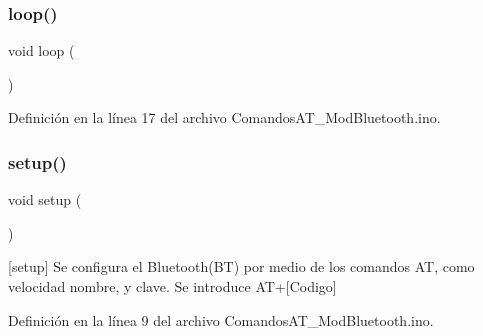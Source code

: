 \mbox{\label{_comandos_a_t___mod_bluetooth_8ino_afe461d27b9c48d5921c00d521181f12f}} 
\subsubsection{\texorpdfstring{loop()}{loop()}}
{\footnotesize\ttfamily void loop (\begin{DoxyParamCaption}{ }\end{DoxyParamCaption})}



Definición en la línea 17 del archivo Comandos\+A\+T\+\_\+\+Mod\+Bluetooth.\+ino.

\mbox{\label{_comandos_a_t___mod_bluetooth_8ino_a4fc01d736fe50cf5b977f755b675f11d}} 
\subsubsection{\texorpdfstring{setup()}{setup()}}
{\footnotesize\ttfamily void setup (\begin{DoxyParamCaption}{ }\end{DoxyParamCaption})}

\mbox{[}setup\mbox{]} Se configura el Bluetooth(\+B\+T) por medio de los comandos AT, como velocidad nombre, y clave. Se introduce A\+T+\mbox{[}Codigo\mbox{]} 

Definición en la línea 9 del archivo Comandos\+A\+T\+\_\+\+Mod\+Bluetooth.\+ino.

